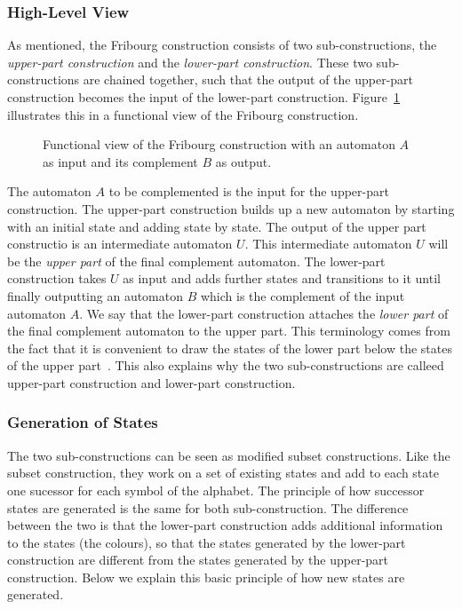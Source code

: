 \subsubsection{High-Level View}
As mentioned, the Fribourg construction consists of two sub-constructions, the \textit{upper-part construction} and the \textit{lower-part construction}. These two sub-constructions are chained together, such that the output of the upper-part construction becomes the input of the lower-part construction. Figure~\ref{fribourg_construction} illustrates this in a functional view of the Fribourg construction.

\begin{figure}[htb]
\centering
\FribourgConstruction
\caption{Functional view of the Fribourg construction with an automaton $A$ as input and its complement $B$ as output.}
\label{fribourg_construction}
\end{figure}

The automaton $A$ to be complemented is the input for the upper-part construction. The upper-part construction builds up a new automaton by starting with an initial state and adding state by state. The output of the upper part constructio is an intermediate automaton $U$. This intermediate automaton $U$ will be the \textit{upper part} of the final complement automaton. The lower-part construction takes $U$ as input and adds further states and transitions to it until finally outputting an automaton $B$ which is the complement of the input automaton $A$. We say that the lower-part construction attaches the \textit{lower part} of the final complement automaton to the upper part. This terminology comes from the fact that it is convenient to draw the states of the lower part below the states of the upper part~\cite{2014_joel_ulrich}. This also explains why the two sub-constructions are calleed upper-part construction and lower-part construction.


\subsubsection{Generation of States}
The two sub-constructions can be seen as modified subset constructions. Like the subset construction, they work on a set of existing states and add to each state one sucessor for each symbol of the alphabet. The principle of how successor states are generated is the same for both sub-construction. The difference between the two is that the lower-part construction adds additional information to the states (the colours), so that the states generated by the lower-part construction are different from the states generated by the upper-part construction. Below we explain this basic principle of how new states are generated.

